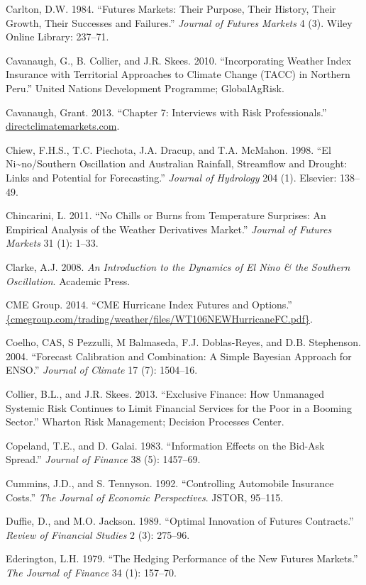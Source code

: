 \documentclass[article]{jss}
\begin{document}
Carlton, D.W. 1984. ``Futures Markets: Their Purpose, Their History,
Their Growth, Their Successes and Failures.'' \emph{Journal of Futures
Markets} 4 (3). Wiley Online Library: 237--71.

Cavanaugh, G., B. Collier, and J.R. Skees. 2010. ``Incorporating Weather
Index Insurance with Territorial Approaches to Climate Change (TACC) in
Northern Peru.'' United Nations Development Programme; GlobalAgRisk.

Cavanaugh, Grant. 2013. ``Chapter 7: Interviews with Risk
Professionals.'' \url{directclimatemarkets.com}.

Chiew, F.H.S., T.C. Piechota, J.A. Dracup, and T.A. McMahon. 1998. ``El
Ni\textasciitilde{}no/Southern Oscillation and Australian Rainfall,
Streamflow and Drought: Links and Potential for Forecasting.''
\emph{Journal of Hydrology} 204 (1). Elsevier: 138--49.

Chincarini, L. 2011. ``No Chills or Burns from Temperature Surprises: An
Empirical Analysis of the Weather Derivatives Market.'' \emph{Journal of
Futures Markets} 31 (1): 1--33.

Clarke, A.J. 2008. \emph{An Introduction to the Dynamics of El Nino \&
the Southern Oscillation}. Academic Press.

CME Group. 2014. ``CME Hurricane Index Futures and Options.''
\url{\{cmegroup.com/trading/weather/files/WT106NEWHurricaneFC.pdf\}}.

Coelho, CAS, S Pezzulli, M Balmaseda, F.J. Doblas-Reyes, and D.B.
Stephenson. 2004. ``Forecast Calibration and Combination: A Simple
Bayesian Approach for ENSO.'' \emph{Journal of Climate} 17 (7):
1504--16.

Collier, B.L., and J.R. Skees. 2013. ``Exclusive Finance: How Unmanaged
Systemic Risk Continues to Limit Financial Services for the Poor in a
Booming Sector.'' Wharton Risk Management; Decision Processes Center.

Copeland, T.E., and D. Galai. 1983. ``Information Effects on the Bid-Ask
Spread.'' \emph{Journal of Finance} 38 (5): 1457--69.

Cummins, J.D., and S. Tennyson. 1992. ``Controlling Automobile Insurance
Costs.'' \emph{The Journal of Economic Perspectives}. JSTOR, 95--115.

Duffie, D., and M.O. Jackson. 1989. ``Optimal Innovation of Futures
Contracts.'' \emph{Review of Financial Studies} 2 (3): 275--96.

Ederington, L.H. 1979. ``The Hedging Performance of the New Futures
Markets.'' \emph{The Journal of Finance} 34 (1): 157--70.
\end{document}
